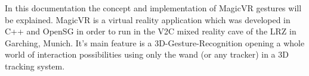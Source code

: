 In this documentation the concept and implementation of MagicVR gestures will be
explained. MagicVR is a virtual reality application which was developed in C++
and OpenSG in order to run in the V2C mixed reality cave of the LRZ in Garching,
Munich. It\rq{}s main feature is a 3D-Gesture-Recognition opening a whole world
of interaction possibilities using only the wand (or any tracker) in a 3D
tracking system.
